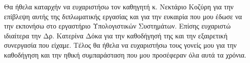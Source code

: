 \begin{acknowledgements}
Θα ήθελα καταρχήν να ευχαριστήσω τον καθηγητή κ. Νεκτάριο Κοζύρη
για την επίβλεψη αυτής της διπλωματικής εργασίας και για την
ευκαιρία που μου έδωσε να την εκπονήσω στο εργαστήριο Υπολογιστικών Συστημάτων. Επίσης ευχαριστώ ιδιαίτερα την Δρ.
Κατερίνα Δόκα για την καθοδήγησή της και την εξαιρετική
συνεργασία που είχαμε. Τέλος θα ήθελα να ευχαριστήσω τους γονείς
μου για την καθοδήγηση και την ηθική συμπαράσταση που μου
προσέφεραν όλα αυτά τα χρόνια.
\end{acknowledgements}
